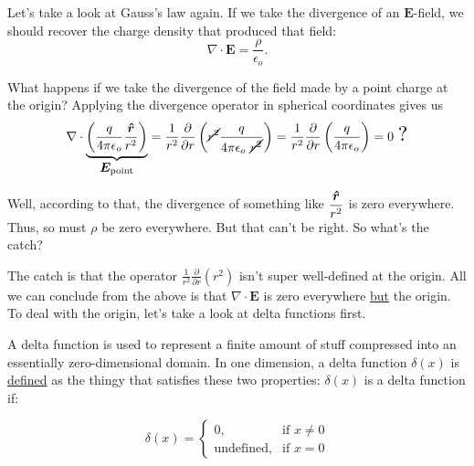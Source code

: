 \documentclass{article}
\begin{document}
\vspace{1em}

Let's take a look at Gauss's law again. If we take the divergence of an $\bm{E}$-field, we should recover the charge density that produced that field:
\begin{equation*}
    \nabla \cdot \bm{E} = \frac{\rho}{\epsilon_o}.
\end{equation*}

What happens if we take the divergence of the field made by a point charge at the origin? Applying the divergence operator in spherical coordinates gives us
\begin{equation*}
    \nabla \cdot \underbrace{\left( \frac{q}{4\pi\epsilon_o} \frac{\rhat}{r^2} \right)}_{\displaystyle \bm{E}_{\text{point}}} = \frac{1}{r^2} \frac{\partial}{\partial r} \left( \cancel{r^2} \frac{q}{4\pi\epsilon_o\ \cancel{r^2}} \right) = \frac{1}{r^2} \frac{\partial}{\partial r} \left( \frac{q}{4\pi\epsilon_o} \right) = 0\ \Scale[1.6]{?}
\end{equation*}

Well, according to that, the divergence of something like $\displaystyle \frac{\bm{\hat{r}}}{r^2}$ is zero everywhere. Thus, so must $\rho$ be zero everywhere. But that can't be right. So what's the catch?

\vspace{1em}

The catch is that the operator $\displaystyle \frac{1}{r^2} \frac{\partial}{\partial r} \left( r^2 \right)$ isn't super well-defined at the origin. All we can conclude from the above is that $\nabla \cdot \bm{E}$ is zero everywhere \underline{but} the origin. To deal with the origin, let's take a look at delta functions first.

\vspace{1em}

A delta function is used to represent a finite amount of stuff compressed into an essentially zero-dimensional domain. In one dimension, a delta function $\delta(x)$ is \underline{defined} as the thingy that satisfies these two properties: $\delta(x)$ is a delta function if:

\begin{equation*}
    \displaystyle \delta(x) = \begin{cases} \displaystyle 0, & \text{if } x \neq 0 \\ \displaystyle \text{undefined}, & \text{if } x = 0 \end{cases}
\end{equation*}
\end{document}
